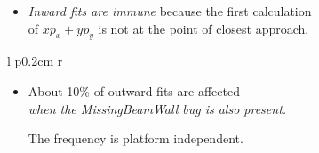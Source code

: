 \begin{slide*}

\slideframe{}
\huge
{}
\Large

\begin{minipage}[t]{\linewidth}

\vspace{0.2cm}

\begin{itemize}

  \item {\it Inward fits are immune} because the first calculation \\
  of $x p_x + y p_y$ is not at the point of closest approach.

\end{itemize}

\begin{tabular}{l p{0.2cm} r} \hspace{-0.38cm}
  \begin{minipage}[b]{0.62\linewidth}
    \begin{itemize}

      \item About 10\% of outward fits are affected \\
	{\it when the MissingBeamWall bug is also present.}

      \vspace{0.3cm}

      The frequency is platform independent.

      \vspace{0.6cm}


\end{itemize}
\end{minipage}
\end{tabular}
\end{minipage}
\end{slide*}
